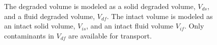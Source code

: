 \begin{figure}[h!]
  \begin{center}
    \def\svgwidth{\textwidth}
    
  \end{center}
  \caption[Constituents of a Mixed Cell Control Volume]{The degraded volume is 
  modeled as a solid degraded volume, $V_{ds}$, and a fluid degraded volume, 
  $V_{df}$. The intact volume is modeled as an intact solid volume, $V_{is}$, and 
  an intact fluid volume $V_{if}$.  Only contaminants in $V_{df}$ are available 
  for transport.}
  \label{fig:deg_sorb_volumes}
\end{figure}

